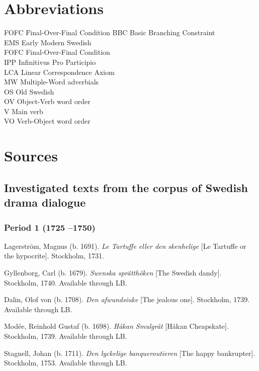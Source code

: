 \documentclass[output=paper, colorlinks, citecolor=brown]{langscibook}
\begin{document}
\section*{Abbreviations}
\begin{multicols}{2}
\begin{tabbing}
FOFC \hspace{.5ex} \= Final-Over-Final Condition\kill
BBC  \>   Basic Branching Constraint\\
EMS  \>   Early Modern Swedish\\
FOFC \>    Final-Over-Final Condition\\
IPP  \>   Infinitivus Pro Participio\\
LCA  \>   Linear Correspondence Axiom\\
MW   \>  Multiple-Word adverbials\\
OS   \>  Old Swedish\\
OV   \>  Object-Verb word order\\
V    \> Main verb\\
VO   \>  Verb-Object word order
\end{tabbing}
\end{multicols}

\section*{Sources}

\subsection*{Investigated texts from the corpus of Swedish drama dialogue }
\subsubsection*{Period 1 (1725 –1750)}

\begin{description}[font=\normalfont]\sloppy
\item[1A:] Lagerström, Magnus (b. 1691). \textit{Le Tartuffe eller den skenhelige}  [Le Tartuffe or the hypocrite]. Stockholm, 1731. 
\item[1B:] Gyllenborg, Carl (b. 1679). \textit{Swenska sprätthöken} [The Swedish dandy]. Stockholm, 1740. Available through LB.
\item[1C:] Dalin, Olof von (b. 1708). \textit{Den afwundsiuke} [The jealous one]. Stockholm, 1739. Available through LB. 
\item[1D:] Modée, Reinhold Gustaf (b. 1698). \textit{Håkan Smulgråt} [Håkan Cheapskate]. Stockholm, 1739. Available through LB. 
\item[1E:] Stagnell, Johan (b. 1711). \textit{Den lyckelige banqueroutieren} [The happy bankrupter]. Stockholm, 1753. Available through LB.
\end{description}
\end{document}
